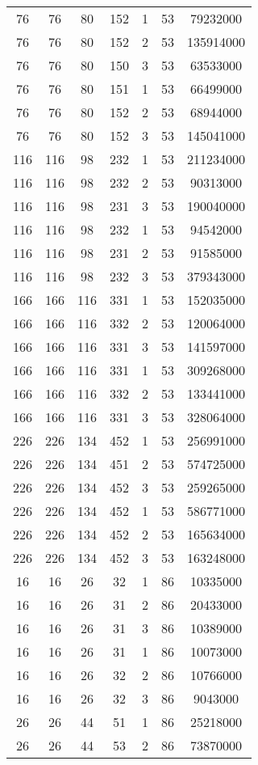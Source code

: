 \documentclass[a4paper,11pt]{article}
\begin{document}
\begin{longtable}{ |c|c|c|c|c|c|c| }
76 & 76 & 80 & 152 & 1 & 53 & 79232000 \\
76 & 76 & 80 & 152 & 2 & 53 & 135914000 \\
76 & 76 & 80 & 150 & 3 & 53 & 63533000 \\
76 & 76 & 80 & 151 & 1 & 53 & 66499000 \\
76 & 76 & 80 & 152 & 2 & 53 & 68944000 \\
76 & 76 & 80 & 152 & 3 & 53 & 145041000 \\
116 & 116 & 98 & 232 & 1 & 53 & 211234000 \\
116 & 116 & 98 & 232 & 2 & 53 & 90313000 \\
116 & 116 & 98 & 231 & 3 & 53 & 190040000 \\
116 & 116 & 98 & 232 & 1 & 53 & 94542000 \\
116 & 116 & 98 & 231 & 2 & 53 & 91585000 \\
116 & 116 & 98 & 232 & 3 & 53 & 379343000 \\
166 & 166 & 116 & 331 & 1 & 53 & 152035000 \\
166 & 166 & 116 & 332 & 2 & 53 & 120064000 \\
166 & 166 & 116 & 331 & 3 & 53 & 141597000 \\
166 & 166 & 116 & 331 & 1 & 53 & 309268000 \\
166 & 166 & 116 & 332 & 2 & 53 & 133441000 \\
166 & 166 & 116 & 331 & 3 & 53 & 328064000 \\
226 & 226 & 134 & 452 & 1 & 53 & 256991000 \\
226 & 226 & 134 & 451 & 2 & 53 & 574725000 \\
226 & 226 & 134 & 452 & 3 & 53 & 259265000 \\
226 & 226 & 134 & 452 & 1 & 53 & 586771000 \\
226 & 226 & 134 & 452 & 2 & 53 & 165634000 \\
226 & 226 & 134 & 452 & 3 & 53 & 163248000 \\
16 & 16 & 26 & 32 & 1 & 86 & 10335000 \\
16 & 16 & 26 & 31 & 2 & 86 & 20433000 \\
16 & 16 & 26 & 31 & 3 & 86 & 10389000 \\
16 & 16 & 26 & 31 & 1 & 86 & 10073000 \\
16 & 16 & 26 & 32 & 2 & 86 & 10766000 \\
16 & 16 & 26 & 32 & 3 & 86 & 9043000 \\
26 & 26 & 44 & 51 & 1 & 86 & 25218000 \\
26 & 26 & 44 & 53 & 2 & 86 & 73870000 \\

\end{longtable}
\end{document}
